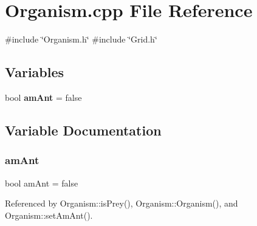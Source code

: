 \section{Organism.\+cpp File Reference}
\label{Organism_8cpp}
{\ttfamily \#include \char`\"{}Organism.\+h\char`\"{}}\newline
{\ttfamily \#include \char`\"{}Grid.\+h\char`\"{}}\newline
\subsection*{Variables}
\begin{DoxyCompactItemize}
\item 
bool \textbf{ am\+Ant} = false
\end{DoxyCompactItemize}


\subsection{Variable Documentation}
\mbox{\label{Organism_8cpp_a900bc6f8ceeedef124e764e3c72b1735}} 
\subsubsection{am\+Ant}
{\footnotesize\ttfamily bool am\+Ant = false}



Referenced by Organism\+::is\+Prey(), Organism\+::\+Organism(), and Organism\+::set\+Am\+Ant().

